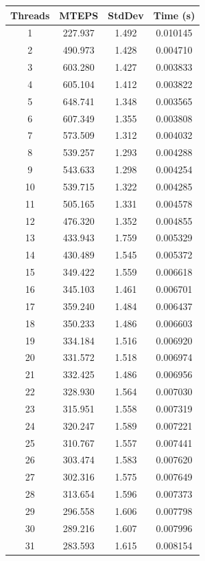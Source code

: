 \documentclass[10pt,twocolumn,letterpaper]{article}
\begin{document}
\begin{table}[h]
\renewcommand\arraystretch{0.8}
\centering
\begin{tabular}{@{}c|ccc@{}}
\toprule
Threads          & MTEPS  & StdDev     & Time (s)      \\ \midrule
1 & 227.937 & 1.492 & 0.010145 \\
2 & 490.973 & 1.428 & 0.004710 \\
3 & 603.280 & 1.427 & 0.003833 \\
4 & 605.104 & 1.412 & 0.003822 \\
5 & 648.741 & 1.348 & 0.003565 \\
6 & 607.349 & 1.355 & 0.003808 \\
7 & 573.509 & 1.312 & 0.004032 \\
8 & 539.257 & 1.293 & 0.004288 \\
9 & 543.633 & 1.298 & 0.004254 \\
10 & 539.715 & 1.322 & 0.004285 \\
11 & 505.165 & 1.331 & 0.004578 \\
12 & 476.320 & 1.352 & 0.004855 \\
13 & 433.943 & 1.759 & 0.005329 \\
14 & 430.489 & 1.545 & 0.005372 \\
15 & 349.422 & 1.559 & 0.006618 \\
16 & 345.103 & 1.461 & 0.006701 \\
17 & 359.240 & 1.484 & 0.006437 \\
18 & 350.233 & 1.486 & 0.006603 \\
19 & 334.184 & 1.516 & 0.006920 \\
20 & 331.572 & 1.518 & 0.006974 \\
21 & 332.425 & 1.486 & 0.006956 \\
22 & 328.930 & 1.564 & 0.007030 \\
23 & 315.951 & 1.558 & 0.007319 \\
24 & 320.247 & 1.589 & 0.007221 \\
25 & 310.767 & 1.557 & 0.007441 \\
26 & 303.474 & 1.583 & 0.007620 \\
27 & 302.316 & 1.575 & 0.007649 \\
28 & 313.654 & 1.596 & 0.007373 \\
29 & 296.558 & 1.606 & 0.007798 \\
30 & 289.216 & 1.607 & 0.007996 \\
31 & 283.593 & 1.615 & 0.008154 \\

\end{tabular}
\end{table}
\end{document}
